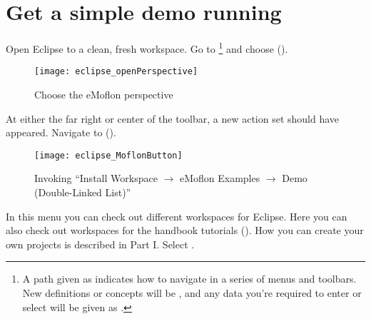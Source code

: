 \newpage
\genHeader

\section{Get a simple demo running}


\begin{stepbystep}
\hypertarget{simpleDemo common}{} 
\item
Open Eclipse to a clean, fresh workspace.
Go to  \footnote{A path given as  indicates how to navigate in a series of menus and toolbars.
New definitions or concepts will be , and any data you're required to enter or select will be given as .} and choose  ().

\begin{figure}[htbp]
	\centering
  \texttt{[image: eclipse\_openPerspective]}
	\caption{Choose the eMoflon perspective}
	\label{eclipse:openPerspective}
\end{figure} 

\item
At either the far right or center of the toolbar, a new action set should have appeared.
Navigate to 
 ().
%
\vspace{0.5cm}
\begin{figure}[htbp]
	\centering
  \texttt{[image: eclipse\_MoflonButton]}
	\caption{Invoking \enquote{Install Workspace $\to$ eMoflon Examples $\to$ Demo (Double-Linked List)}}
	\label{eclipse:newMetamodel}
\end{figure}

\item
In this menu you can check out different workspaces for Eclipse. 
Here you can also check out workspaces for the handbook tutorials ().
How you can create your own projects is described in Part I.
Select . 


\end{stepbystep}
